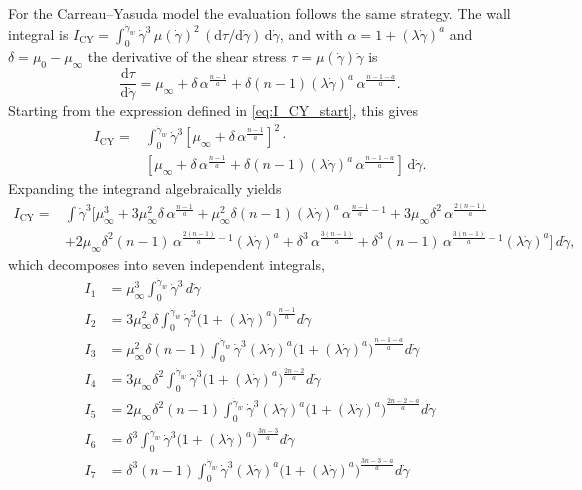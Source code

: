 \documentclass[lineno]{jfm}
\begin{document}
For the Carreau--Yasuda model the evaluation follows the same strategy. The wall
integral is $I_{\mathrm{CY}}=\int_0^{\dot\gamma_w}\dot\gamma^{3}\,
\mu(\dot\gamma)^{2}\,(\mathrm d\tau/\mathrm d\dot\gamma)\,\mathrm d\dot\gamma$, and
with $\alpha = 1+(\lambda\dot{\gamma})^a$ and $\delta=\mu_0-\mu_\infty$ the
derivative of the shear stress $\tau=\mu(\dot\gamma)\dot\gamma$ is
\begin{equation}
\frac{\mathrm d\tau}{\mathrm d\dot\gamma}
= \mu_\infty + \delta\,\alpha^{\frac{n-1}{a}}
+ \delta(n-1)(\lambda\dot\gamma)^a\,\alpha^{\frac{n-1-a}{a}}.
\label{eq:dtau_CY}
\end{equation}
Starting from the expression defined in \eqref{eq:I_CY_start}, this gives
\begin{align}
I_{\mathrm{CY}}
=&
\int_{0}^{\dot{\gamma}_w}
\dot{\gamma}^3
\left[\mu_{\infty}+\delta\,\alpha^{\frac{n-1}{a}}\right]^2 \cdot \nonumber\\
& \left[\mu_{\infty}
+\delta\,\alpha^{\frac{n-1}{a}}
+\delta(n-1)(\lambda \dot{\gamma})^a\,\alpha^{\frac{n-1-a}{a}} \right]\,\mathrm{d}
\dot{\gamma}.
\end{align}
Expanding the integrand algebraically yields
\begin{align}
I_{\mathrm{CY}}
= &\int \dot{\gamma}^3 \Bigg[ \mu_\infty^3
  + 3\mu_\infty^2 \delta\, \alpha^{\frac{n-1}{a}}
  + \mu_\infty^2 \delta (n-1)(\lambda \dot{\gamma})^a\, \alpha^{\frac{n-1}{a}-1}
  + 3\mu_\infty \delta^2\, \alpha^{\frac{2(n-1)}{a}} \nonumber\\
& + 2\mu_\infty \delta^2 (n-1)\, \alpha^{\frac{2(n-1)}{a}-1} (\lambda \dot{\gamma})^a
  + \delta^3\, \alpha^{\frac{3(n-1)}{a}}
  + \delta^3(n-1)\, \alpha^{\frac{3(n-1)}{a}-1} (\lambda \dot{\gamma})^a \Bigg]
  \,d\dot{\gamma},
\end{align}
which decomposes into seven independent integrals,
\begin{align}
I_1 &= \mu_\infty^3 \int_0^{\dot{\gamma}_w} \dot{\gamma}^3\, d\dot{\gamma} \\
I_2 &= 3\mu_\infty^2 \delta \int_0^{\dot{\gamma}_w}
       \dot{\gamma}^3 \bigl(1 + (\lambda \dot{\gamma})^a\bigr)^{\frac{n-1}{a}}
       d\dot{\gamma}\\
I_3 &= \mu_\infty^2 \delta (n-1) \int_0^{\dot{\gamma}_w}
       \dot{\gamma}^3 (\lambda\dot{\gamma})^a
       \bigl(1 + (\lambda \dot{\gamma})^a\bigr)^{\frac{n-1-a}{a}}
       d\dot{\gamma}\\
I_4 &= 3\mu_\infty \delta^2 \int_0^{\dot{\gamma}_w}
       \dot{\gamma}^3 \bigl(1 + (\lambda \dot{\gamma})^a\bigr)^{\frac{2n-2}{a}}
       d\dot{\gamma}\\
I_5 &= 2\mu_\infty \delta^2 (n-1) \int_0^{\dot{\gamma}_w}
       \dot{\gamma}^3 (\lambda\dot{\gamma})^a
       \bigl(1 + (\lambda \dot{\gamma})^a\bigr)^{\frac{2n-2-a}{a}}
       d\dot{\gamma}\\
I_6 &= \delta^3 \int_0^{\dot{\gamma}_w}
       \dot{\gamma}^3 \bigl(1 + (\lambda \dot{\gamma})^a\bigr)^{\frac{3n-3}{a}}
       d\dot{\gamma}\\
I_7 &= \delta^3 (n-1) \int_0^{\dot{\gamma}_w}
       \dot{\gamma}^3 (\lambda\dot{\gamma})^a
       \bigl(1 + (\lambda \dot{\gamma})^a\bigr)^{\frac{3n-3-a}{a}}
       d\dot{\gamma}
\end{align}
\end{document}
